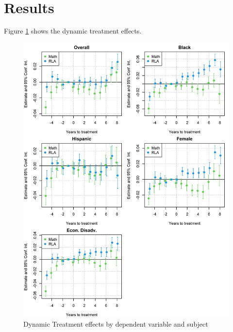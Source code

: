 \section{Results}

Figure \ref{ResultsPlot} shows the dynamic treatment effects.

%

%

\begin{figure}[!h]
	\centering
	\includegraphics[scale=1]{"../Code & Data/ResultsPlot.png"}
	\caption{Dynamic Treatment effects by dependent variable and subject}
	\label{ResultsPlot}
\end{figure}




